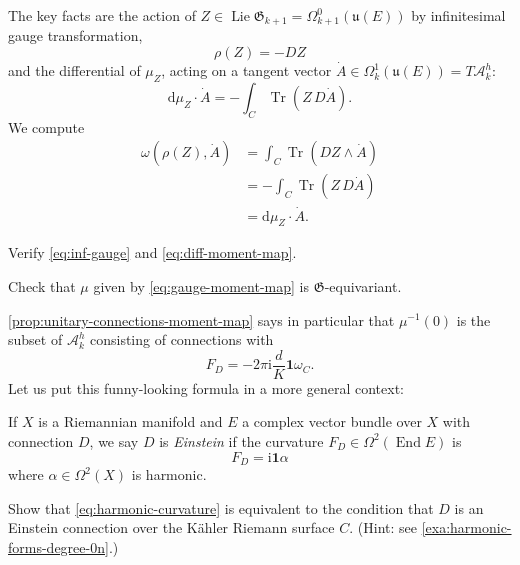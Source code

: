 \documentclass[12pt,letterpaper,reqno]{article}
\numberwithin{equation}{section}
\newcommand{\fu}{{\mathfrak u}}
\newcommand{\fG}{{\mathfrak G}}
\newcommand{\cA}{\ensuremath{\mathcal A}}
\newcommand{\kahler}{K\"ahler\xspace}
\newcommand{\I}{{\mathrm i}}
\newcommand\bid{{\mathbf 1}}
\newcommand{\de}{\mathrm{d}}
\newcommand{\ti}[1]{\textit{#1}}
\DeclareMathOperator{\Tr}{Tr}
\DeclareMathOperator{\End}{End}
\DeclareMathOperator{\Lie}{Lie}
\begin{document}
\begin{pf} The key facts are the action of
$Z \in \Lie \fG_{k+1} = \Omega^0_{k+1}(\fu(E))$ by infinitesimal gauge transformation,
\begin{equation} \label{eq:inf-gauge}
  \rho(Z) = -DZ
\end{equation}
and the differential of $\mu_Z$, acting on a tangent vector
$\dot{A} \in \Omega^1_{k}(\fu(E)) = T\cA^h_k$:
\begin{equation} \label{eq:diff-moment-map}
\de \mu_Z \cdot \dot{A} = -\int_C \Tr (Z \, D\dot{A}).
\end{equation}
We compute
\begin{align}
  \omega(\rho(Z), \dot{A}) &= \int_C \Tr (DZ \wedge \dot{A}) \\
  &= -\int_C \Tr (Z \, D\dot{A}) \\
  &= \de \mu_Z \cdot \dot{A}.
\end{align}
\end{pf}

\begin{exercise}
Verify \eqref{eq:inf-gauge} and \eqref{eq:diff-moment-map}.
\end{exercise}

\begin{exercise}
Check that $\mu$ given by \eqref{eq:gauge-moment-map}
is $\fG$-equivariant.
\end{exercise}

\autoref{prop:unitary-connections-moment-map} says in particular that
$\mu^{-1}(0)$ is the subset of $\cA^h_k$
consisting of connections with
\begin{equation} \label{eq:harmonic-curvature}
  F_D = -2 \pi \I \frac{d}{K} \bid \omega_C.
\end{equation}
Let us put this funny-looking formula in a more general context:

\begin{defn}
If $X$ is a Riemannian manifold and $E$ a complex
vector bundle over $X$ with connection $D$, we say $D$ is
\ti{Einstein} if the curvature $F_D \in \Omega^2(\End E)$
is
\begin{equation}
  F_D = \I \bid \alpha
\end{equation}
where $\alpha \in \Omega^2(X)$ is harmonic.
\end{defn}

\begin{exercise} Show that \eqref{eq:harmonic-curvature}
is equivalent to the condition that $D$ is an Einstein
connection over the \kahler Riemann surface $C$.
(Hint: see \autoref{exa:harmonic-forms-degree-0n}.)
\end{exercise}
\end{document}
